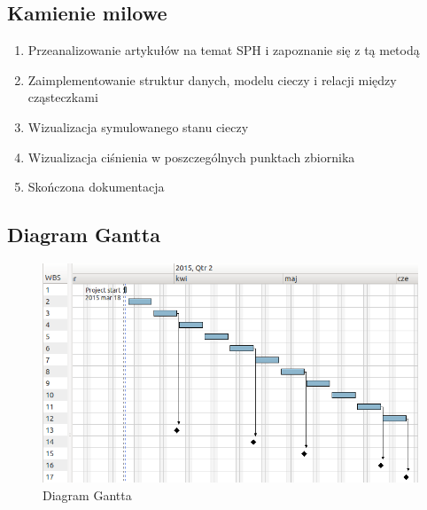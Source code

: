 \subsection{Kamienie milowe}
\begin{enumerate}[label=K\arabic*{.}]
    \item Przeanalizowanie artykułów na temat SPH i zapoznanie się z tą metodą
    \item Zaimplementowanie struktur danych, modelu cieczy i relacji między cząsteczkami
    \item Wizualizacja symulowanego stanu cieczy
    \item Wizualizacja ciśnienia w poszczególnych punktach zbiornika
    \item Skończona dokumentacja
\end{enumerate}

\newpage
\subsection{Diagram Gantta}
\begin{figure}[H] 
 \begin{center}
  \includegraphics[width=\textwidth]{../harmonogram/gantt.png}
 \end{center}
 \caption{Diagram Gantta}
 \label{fig:gantt}
\end{figure}
 